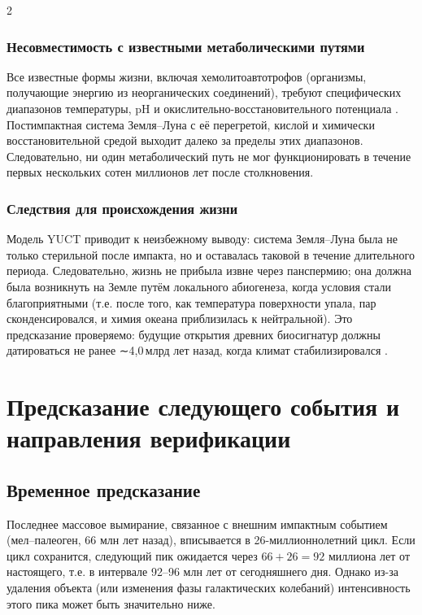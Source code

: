 \documentclass[11pt,a4paper]{article}
\begin{document}
\begin{multicols}{2}
		\subsubsection{Несовместимость с известными метаболическими путями}
		
		Все известные формы жизни, включая хемолитоавтотрофов (организмы, получающие энергию из неорганических соединений), требуют специфических диапазонов температуры, pH и окислительно-восстановительного потенциала \cite{Chemolithoautotroph}. Постимпактная система Земля–Луна с её перегретой, кислой и химически восстановительной средой выходит далеко за пределы этих диапазонов. Следовательно, ни один метаболический путь не мог функционировать в течение первых нескольких сотен миллионов лет после столкновения.
		
		\subsubsection{Следствия для происхождения жизни}
		
		Модель YUCT приводит к неизбежному выводу: система Земля–Луна была не только стерильной после импакта, но и оставалась таковой в течение длительного периода. Следовательно, жизнь не прибыла извне через панспермию; она должна была возникнуть на Земле путём локального абиогенеза, когда условия стали благоприятными (т.е. после того, как температура поверхности упала, пар сконденсировался, и химия океана приблизилась к нейтральной). Это предсказание проверяемо: будущие открытия древних биосигнатур должны датироваться не ранее ∼4,0 млрд лет назад, когда климат стабилизировался \cite{AbiogenesisReview}.
		
		\section{Предсказание следующего события и направления верификации}
		
		\subsection{Временное предсказание}
		
		Последнее массовое вымирание, связанное с внешним импактным событием (мел–палеоген, 66 млн лет назад), вписывается в 26-миллионнолетний цикл. Если цикл сохранится, следующий пик ожидается через \(66 + 26 = 92\) миллиона лет от настоящего, т.е. в интервале 92–96 млн лет от сегодняшнего дня. Однако из-за удаления объекта (или изменения фазы галактических колебаний) интенсивность этого пика может быть значительно ниже.
		

\end{multicols}
\end{document}
